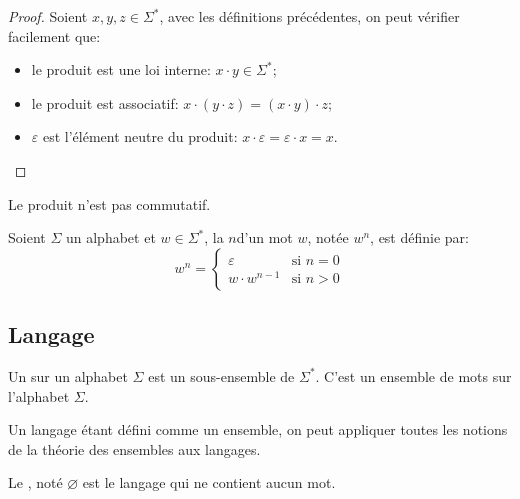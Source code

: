 \begin{proof}
    Soient \( x, y, z \in \Sigma^* \), avec les définitions précédentes, on peut vérifier facilement que:
    \begin{itemize}
    \item
      le produit est une loi interne: $x \cdot y \in \Sigma^*$;
    \item
      le produit est associatif: $x \cdot (y \cdot z) = (x \cdot y) \cdot z$;
    \item
      $\varepsilon$ est l'élément neutre du produit: $x \cdot \varepsilon = \varepsilon \cdot x = x$.
    \end{itemize}
\end{proof}

Le produit n'est pas commutatif.

\begin{definition}
    Soient \( \Sigma \) un alphabet et \( w \in \Sigma^* \), la  \( n \)\ieme d'un mot \( w \), notée \( w^n \), est définie par:
    \[
    w^n =
    \begin{cases}
        \varepsilon     & \text{si $n = 0$} \\
        w \cdot w^{n-1} & \text{si $n > 0$}
    \end{cases}
    \]
\end{definition}


\subsection{Langage}

\begin{definition}
    Un  sur un alphabet \( \Sigma \) est un sous-ensemble de \( \Sigma^* \). C'est un ensemble de mots sur l'alphabet \( \Sigma \).
\end{definition}

Un langage étant défini comme un ensemble, on peut appliquer toutes les notions de la théorie des ensembles aux langages.

\begin{definition}
    Le , noté \( \varnothing \) est le langage qui ne contient aucun mot.
\end{definition}

